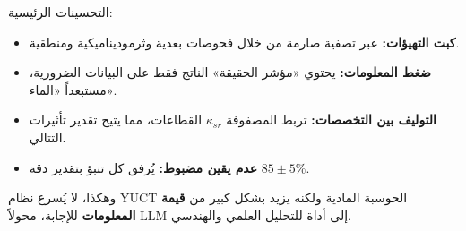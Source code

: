 \documentclass[11pt,a4paper]{article}
\begin{document}
	التحسينات الرئيسية:
	\begin{itemize}
		\item \textbf{كبت التهيؤات:} عبر تصفية صارمة من خلال فحوصات بعدية وثرموديناميكية ومنطقية.
		\item \textbf{ضغط المعلومات:} يحتوي «مؤشر الحقيقة» الناتج فقط على البيانات الضرورية، مستبعداً «الماء».
		\item \textbf{التوليف بين التخصصات:} تربط المصفوفة \(\kappa_{sr}\) القطاعات، مما يتيح تقدير تأثيرات التتالي.
		\item \textbf{عدم يقين مضبوط:} يُرفق كل تنبؤ بتقدير دقة \(85\pm5\%\).
	\end{itemize}
	
	وهكذا، لا يُسرع نظام YUCT الحوسبة المادية ولكنه يزيد بشكل كبير من \textbf{قيمة المعلومات} للإجابة، محولاً LLM إلى أداة للتحليل العلمي والهندسي.
	
\end{document}
